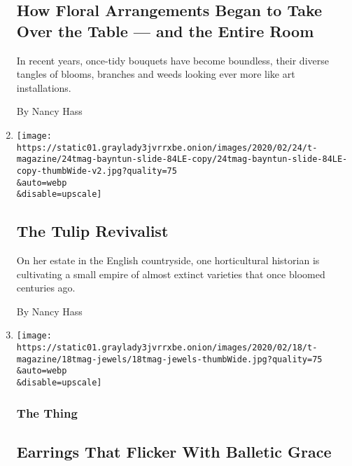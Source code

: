 \begin{enumerate}
  \hypertarget{how-floral-arrangements-began-to-take-over-the-table--and-the-entire-room}{%
  \subsection{How Floral Arrangements Began to Take Over the Table ---
  and the Entire
  Room}\label{how-floral-arrangements-began-to-take-over-the-table--and-the-entire-room}}

  In recent years, once-tidy bouquets have become boundless, their
  diverse tangles of blooms, branches and weeds looking ever more like
  art installations.

  By Nancy Hass
\item
  \href{/2020/02/24/t-magazine/polly-nicholson-bayntun-flowers.html}{}

  \texttt{[image: https://static01.graylady3jvrrxbe.onion/images/2020/02/24/t-magazine/24tmag-bayntun-slide-84LE-copy/24tmag-bayntun-slide-84LE-copy-thumbWide-v2.jpg?quality=75\\\&auto=webp\\\&disable=upscale]}

  \hypertarget{the-tulip-revivalist}{%
  \subsection{The Tulip Revivalist}\label{the-tulip-revivalist}}

  On her estate in the English countryside, one horticultural historian
  is cultivating a small empire of almost extinct varieties that once
  bloomed centuries ago.

  By Nancy Hass
\item
  \href{/2020/02/18/t-magazine/van-cleef-arpels-earrings.html}{}

  \texttt{[image: https://static01.graylady3jvrrxbe.onion/images/2020/02/18/t-magazine/18tmag-jewels/18tmag-jewels-thumbWide.jpg?quality=75\\\&auto=webp\\\&disable=upscale]}

  \hypertarget{the-thing-2}{%
  \subsubsection{The Thing}\label{the-thing-2}}

  \hypertarget{earrings-that-flicker-with-balletic-grace}{%
  \subsection{Earrings That Flicker With Balletic
  Grace}\label{earrings-that-flicker-with-balletic-grace}}


\end{enumerate}
